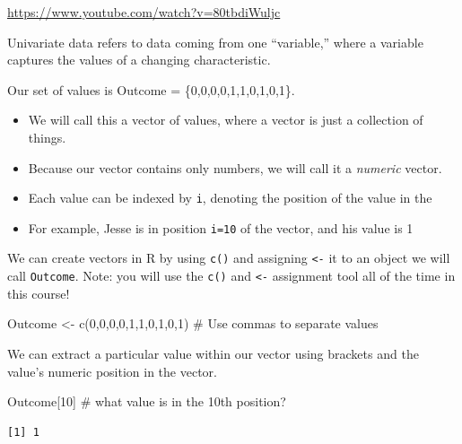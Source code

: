 \documentclass[
  letterpaper,
  DIV=11,
  numbers=noendperiod]{scrreprt}
\newenvironment{Shaded}{\begin{snugshade}}{\end{snugshade}}
\newcommand{\CommentTok}[1]{\textcolor[rgb]{0.37,0.37,0.37}{#1}}
\newcommand{\DecValTok}[1]{\textcolor[rgb]{0.68,0.00,0.00}{#1}}
\newcommand{\FunctionTok}[1]{\textcolor[rgb]{0.28,0.35,0.67}{#1}}
\newcommand{\NormalTok}[1]{\textcolor[rgb]{0.00,0.23,0.31}{#1}}
\newcommand{\OtherTok}[1]{\textcolor[rgb]{0.00,0.23,0.31}{#1}}
\providecommand{\tightlist}{%
  \setlength{\itemsep}{0pt}\setlength{\parskip}{0pt}}\usepackage{longtable,booktabs,array}
\begin{document}
\url{https://www.youtube.com/watch?v=80tbdiWuljc}

Univariate data refers to data coming from one ``variable,'' where a
variable captures the values of a changing characteristic.

Our set of values is Outcome = \{0,0,0,0,1,1,0,1,0,1\}.

\begin{itemize}
\tightlist
\item
  We will call this a vector of values, where a vector is just a
  collection of things.
\item
  Because our vector contains only numbers, we will call it a
  \emph{numeric} vector.
\item
  Each value can be indexed by \texttt{i}, denoting the position of the
  value in the
\item
  For example, Jesse is in position \texttt{i=10} of the vector, and his
  value is 1
\end{itemize}

We can create vectors in R by using \texttt{c()} and assigning
\texttt{\textless{}-} it to an object we will call \texttt{Outcome}.
Note: you will use the \texttt{c()} and \texttt{\textless{}-} assignment
tool all of the time in this course!

\begin{Shaded}
\begin{Highlighting}[]
\NormalTok{Outcome }\OtherTok{\textless{}{-}} \FunctionTok{c}\NormalTok{(}\DecValTok{0}\NormalTok{,}\DecValTok{0}\NormalTok{,}\DecValTok{0}\NormalTok{,}\DecValTok{0}\NormalTok{,}\DecValTok{1}\NormalTok{,}\DecValTok{1}\NormalTok{,}\DecValTok{0}\NormalTok{,}\DecValTok{1}\NormalTok{,}\DecValTok{0}\NormalTok{,}\DecValTok{1}\NormalTok{) }\CommentTok{\# Use commas to separate values}
\end{Highlighting}
\end{Shaded}

We can extract a particular value within our vector using brackets and
the value's numeric position in the vector.

\begin{Shaded}
\begin{Highlighting}[]
\NormalTok{Outcome[}\DecValTok{10}\NormalTok{] }\CommentTok{\# what value is in the 10th position?}
\end{Highlighting}
\end{Shaded}

\begin{verbatim}
[1] 1
\end{verbatim}
\end{document}

